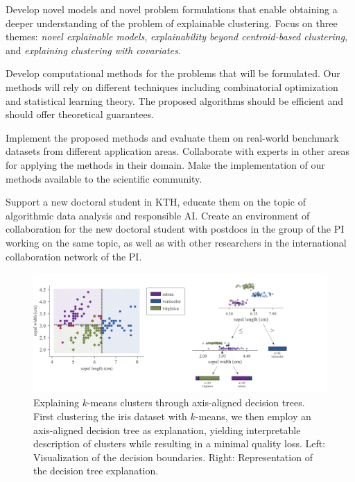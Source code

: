\documentclass[a4paper,11pt]{article}
\begin{document}
\vspace{-2mm}
\begin{description}
\setlength{\itemsep}{-4pt}
\item[{Models and problems:}]
Develop novel models and novel problem formulations that enable 
obtaining a deeper understanding of the problem of explainable clustering.
Focus on three themes: 
\emph{novel explainable models}, 
\emph{explainability beyond centroid-based clustering}, and 
\emph{explaining clustering with covariates}.

\item[{Algorithms:}]
Develop computational methods for the problems that will be formulated.
Our methods will rely on different techniques
including combinatorial optimization and statistical learning theory.
The proposed algorithms should be efficient and should offer theoretical guarantees.

\item[{Empirical evaluation and outreach:}]
Implement the proposed methods and evaluate them on 
real-world benchmark datasets from different application areas.
Collaborate with experts in other areas for applying the methods in their domain.
Make the implementation of our methods available to the scientific community.

\item[{Education in KTH:}]
Support a new doctoral student in KTH, 
educate them on the topic of algorithmic data analysis and responsible AI. 
Create an environment of collaboration for the new doctoral student 
with postdocs in the group of the PI working on the same topic, 
as well as with other researchers in the international collaboration network of the PI.
\end{description}

\begin{figure} 
    \centering
    \includegraphics[height=1.8in]{iris-exclus.pdf}
    \caption{\small Explaining $k$-means clusters through axis-aligned decision trees. First clustering the iris dataset with $k$-means, we then employ an axis-aligned decision tree as explanation, yielding interpretable description of clusters while resulting in a minimal quality loss. Left: Visualization of the decision boundaries. Right: Representation of the decision tree explanation.}
\end{figure}
\end{document}

